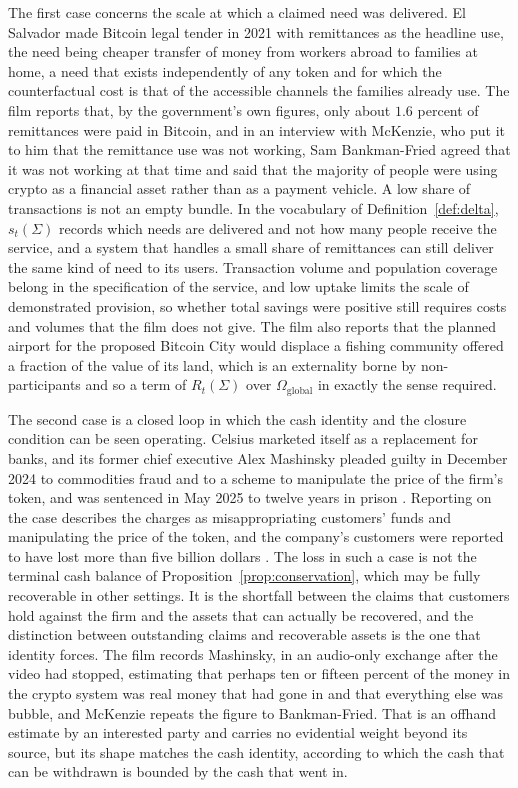 \documentclass[11pt]{article}
\theoremstyle{remark}
\begin{document}
The first case concerns the scale at which a claimed need was delivered. El Salvador made Bitcoin legal tender in 2021 with remittances as the headline use, the need being cheaper transfer of money from workers abroad to families at home, a need that exists independently of any token and for which the counterfactual cost is that of the accessible channels the families already use. The film reports that, by the government's own figures, only about $1.6$ percent of remittances were paid in Bitcoin, and in an interview with McKenzie, who put it to him that the remittance use was not working, Sam Bankman-Fried agreed that it was not working at that time and said that the majority of people were using crypto as a financial asset rather than as a payment vehicle. A low share of transactions is not an empty bundle. In the vocabulary of Definition~\ref{def:delta}, $s_t(\Sigma)$ records which needs are delivered and not how many people receive the service, and a system that handles a small share of remittances can still deliver the same kind of need to its users. Transaction volume and population coverage belong in the specification of the service, and low uptake limits the scale of demonstrated provision, so whether total savings were positive still requires costs and volumes that the film does not give. The film also reports that the planned airport for the proposed Bitcoin City would displace a fishing community offered a fraction of the value of its land, which is an externality borne by non-participants and so a term of $R_t(\Sigma)$ over $\Omega_{\mathrm{global}}$ in exactly the sense required.

The second case is a closed loop in which the cash identity and the closure condition can be seen operating. Celsius marketed itself as a replacement for banks, and its former chief executive Alex Mashinsky pleaded guilty in December 2024 to commodities fraud and to a scheme to manipulate the price of the firm's token, and was sentenced in May 2025 to twelve years in prison \cite{nbc2025,decrypt2025}. Reporting on the case describes the charges as misappropriating customers' funds and manipulating the price of the token, and the company's customers were reported to have lost more than five billion dollars \cite{decrypt2025}. The loss in such a case is not the terminal cash balance of Proposition~\ref{prop:conservation}, which may be fully recoverable in other settings. It is the shortfall between the claims that customers hold against the firm and the assets that can actually be recovered, and the distinction between outstanding claims and recoverable assets is the one that identity forces. The film records Mashinsky, in an audio-only exchange after the video had stopped, estimating that perhaps ten or fifteen percent of the money in the crypto system was real money that had gone in and that everything else was bubble, and McKenzie repeats the figure to Bankman-Fried. That is an offhand estimate by an interested party and carries no evidential weight beyond its source, but its shape matches the cash identity, according to which the cash that can be withdrawn is bounded by the cash that went in.
\end{document}
